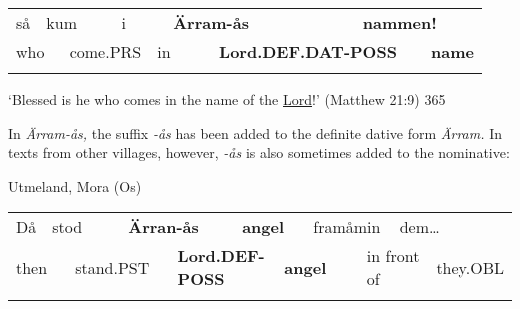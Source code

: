 \begin{tabular}{llllllllll}
\lsptoprule
så & \multicolumn{2}{l}{kum

} & \multicolumn{2}{l}{i

} & \multicolumn{2}{l}{{\bfseries Ärram-ås}

} & \multicolumn{2}{l}{{\bfseries nammen!}

} & \\
\multicolumn{2}{l}{who

} & \multicolumn{2}{l}{come.PRS

} & \multicolumn{2}{l}{in

} & \multicolumn{2}{l}{{\bfseries Lord.DEF.DAT-POSS}

} & \multicolumn{2}{l}{{\bfseries name}

}\\
\lspbottomrule
\end{tabular}

\begin{styleTranslation}
‘Blessed is he who comes in the name of the \href{http://www.godrules.net/library/topics/topic1192.htm}{Lord}!’ (Matthew 21:9) 365

\end{styleTranslation}

\begin{styleBodyTextFirst}
In \textit{Ärram-ås,} the suffix\textit{ -å}\textit{s} has been added to the definite dative form \textit{Ärram. }In texts from other villages, however,\textit{ -å}\textit{s} is also sometimes added to the nominative:

\end{styleBodyTextFirst}

\begin{listWWNumileveli}
\item 

\begin{styleExample}
Utmeland, Mora (Os)

\end{styleExample}

\end{listWWNumileveli}

\begin{tabular}{llllllllllll}
\lsptoprule
Då & \multicolumn{2}{l}{stod

} & \multicolumn{2}{l}{{\bfseries Ärran-ås}

} & \multicolumn{2}{l}{{\bfseries angel}

} & \multicolumn{2}{l}{framåmin

} & \multicolumn{2}{l}{dem…

} & \\
\multicolumn{2}{l}{then

} & \multicolumn{2}{l}{stand.PST

} & \multicolumn{2}{l}{{\bfseries Lord.DEF-POSS}

} & \multicolumn{2}{l}{{\bfseries angel}

} & \multicolumn{2}{l}{in front of

} & \multicolumn{2}{l}{they.OBL

}\\
\lspbottomrule
\end{tabular}

